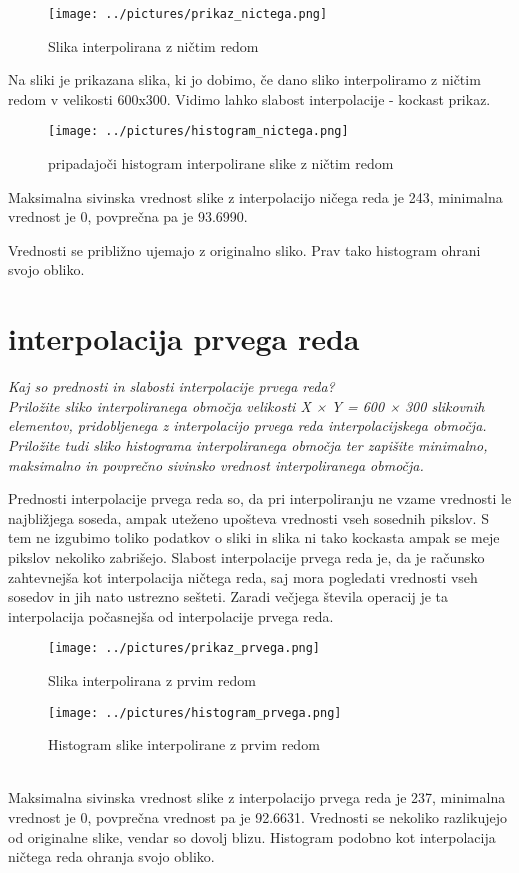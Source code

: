 \documentclass[12pt,a4paper]{article}
\begin{document}
\begin{figure}[h!]
\centering
\texttt{[image: ../pictures/prikaz\_nictega.png]}
\caption{Slika interpolirana z ničtim redom}
\end{figure}
Na sliki je prikazana slika, ki jo dobimo, če dano sliko interpoliramo z ničtim redom v velikosti 600x300. Vidimo lahko slabost interpolacije - kockast prikaz. 
\pagebreak

\begin{figure}[hbtp]
\centering
\texttt{[image: ../pictures/histogram\_nictega.png]}
\caption{pripadajoči histogram interpolirane slike z ničtim redom}
\end{figure}
Maksimalna sivinska vrednost slike z interpolacijo ničega reda je 243, minimalna vrednost je 0, povprečna pa je 93.6990. 

Vrednosti se približno ujemajo z originalno sliko. Prav tako histogram ohrani svojo obliko. 
\section{interpolacija prvega reda}
\emph{Kaj so prednosti in slabosti interpolacije prvega reda?\\
Priložite sliko interpoliranega območja velikosti X × Y = 600 × 300 slikovnih elementov,
pridobljenega z interpolacijo prvega reda interpolacijskega območja. Priložite tudi sliko
histograma interpoliranega območja ter zapišite minimalno, maksimalno in povprečno
sivinsko vrednost interpoliranega območja.}

Prednosti interpolacije prvega reda so, da pri interpoliranju ne vzame vrednosti le najbližjega soseda, ampak uteženo upošteva vrednosti vseh sosednih pikslov. S tem ne izgubimo toliko podatkov o sliki in slika ni tako kockasta ampak se meje pikslov nekoliko zabrišejo. Slabost interpolacije prvega reda je, da je računsko zahtevnejša kot interpolacija ničtega reda, saj mora pogledati vrednosti vseh sosedov in jih nato ustrezno sešteti. Zaradi večjega števila operacij je ta interpolacija počasnejša od interpolacije prvega reda. \\
\pagebreak
\begin{figure}[h!]
\centering
\texttt{[image: ../pictures/prikaz\_prvega.png]}
\caption{Slika interpolirana z prvim redom}
\end{figure}
\begin{figure}[h!]
\centering
\texttt{[image: ../pictures/histogram\_prvega.png]}
\caption{Histogram slike interpolirane z prvim redom}
\end{figure}\\
Maksimalna sivinska vrednost slike z interpolacijo prvega reda je 237, minimalna vrednost je 0, povprečna vrednost pa je 92.6631. Vrednosti se nekoliko razlikujejo od originalne slike, vendar so dovolj blizu. Histogram podobno kot interpolacija ničtega reda ohranja svojo obliko.
\end{document}
